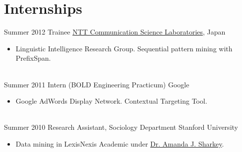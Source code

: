 \documentclass[letterpaper]{twentysecondcv} %
\begin{document}
\section{Internships}
\begin{twenty}
	\twentyitem
    	{Summer}
        {2012}
        {Trainee}
        {\href{http://www.kecl.ntt.co.jp/rps/index.html}{NTT Communication Science Laboratories}, Japan}
        {}
        {\begin{itemize} \itemsep 2pt %
        \item Linguistic Intelligence Research Group. Sequential pattern mining with PrefixSpan.
        \end{itemize}}
    \\
    \twentyitem
    	{Summer}
        {2011}
        {Intern (BOLD Engineering Practicum)}
        {Google}
        {}
        {\begin{itemize}  \itemsep 2pt %
        \item Google AdWords Display Network. Contextual Targeting Tool.
        \end{itemize}}
    \\
    \twentyitem
    	{Summer}
        {2010}
        {Research Assistant, Sociology Department}
        {Stanford University}
        {}
        {\begin{itemize}  \itemsep 2pt %
        \item Data mining in LexisNexis Academic under \href{https://www.chicagobooth.edu/faculty/directory/s/amanda-j-sharkey}{Dr. Amanda J. Sharkey}.
        \end{itemize} }
\end{twenty}
\end{document}
